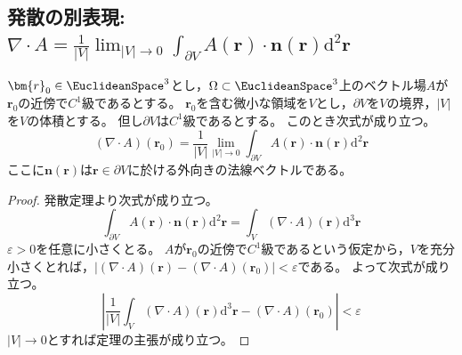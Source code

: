         \subsection{発散の別表現: \texorpdfstring{$\nabla\cdot A = \frac{1}{|V|}\lim_{|V|\to 0} \int_{\partial V} A(\bm{r})\cdot\bm{n}(\bm{r})\mathrm{d}^2\bm{r}$}{発散はベクトル場の法線面積分の体積の商の極限である}}
            \begin{shadebox}
                $\bm{r}_0\in\EuclideanSpace^3$とし，$\Omega\subset\EuclideanSpace^3$上のベクトル場$A$が$\bm{r}_0$の近傍で$C^1$級であるとする。
                $\bm{r}_0$を含む微小な領域を$V$とし，$\partial V$を$V$の境界，$|V|$を$V$の体積とする。
                但し$\partial V$は$C^1$級であるとする。
                このとき次式が成り立つ。
                \[ (\nabla\cdot A)(\bm{r}_0) = \frac{1}{|V|}\lim_{|V|\to 0}\int_{\partial V} A(\bm{r})\cdot\bm{n}(\bm{r})\mathrm{d}^2\bm{r} \]
                ここに$\bm{n}(\bm{r})$は$\bm{r}\in\partial V$に於ける外向きの法線ベクトルである。
            \end{shadebox}
            \begin{proof}
                \quad\par
                発散定理より次式が成り立つ。
                \[ \int_{\partial V} A(\bm{r})\cdot\bm{n}(\bm{r})\mathrm{d}^2\bm{r} = \int_V (\nabla\cdot A)(\bm{r})\mathrm{d}^3\bm{r} \]
                $\varepsilon>0$を任意に小さくとる。
                $A$が$\bm{r}_0$の近傍で$C^1$級であるという仮定から，$V$を充分小さくとれば，$|(\nabla\cdot A)(\bm{r}) - (\nabla\cdot A)(\bm{r}_0)| < \varepsilon$である。
                よって次式が成り立つ。
                \[ \left| \frac{1}{|V|}\int_V (\nabla\cdot A)(\bm{r})\mathrm{d}^3\bm{r} - (\nabla\cdot A)(\bm{r}_0) \right| < \varepsilon \]
                $|V|\to 0$とすれば定理の主張が成り立つ。
            \end{proof}
